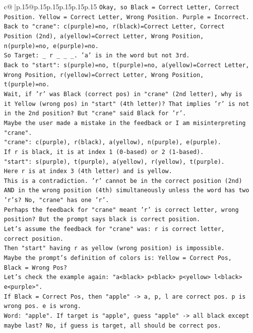 \documentclass{article}
\begin{document}
{\begin{supertabular}{c@{$\;$}|p{.15\linewidth}@{}p{.15\linewidth}p{.15\linewidth}p{.15\linewidth}p{.15\linewidth}p{.15\linewidth}}
{{{\texttt{Okay, so Black = Correct Letter, Correct Position. Yellow = Correct Letter, Wrong Position. Purple = Incorrect.} \\
\texttt{Back to "crane": c(purple)=no, r(black)=Correct Letter, Correct Position (2nd), a(yellow)=Correct Letter, Wrong Position, n(purple)=no, e(purple)=no.} \\
\texttt{So Target: \_ r \_ \_ \_. 'a' is in the word but not 3rd.} \\
\texttt{Back to "start": s(purple)=no, t(purple)=no, a(yellow)=Correct Letter, Wrong Position, r(yellow)=Correct Letter, Wrong Position, t(purple)=no.} \\
\texttt{Wait, if 'r' was Black (correct pos) in "crane" (2nd letter), why is it Yellow (wrong pos) in "start" (4th letter)? That implies 'r' is not in the 2nd position? But "crane" said Black for 'r'.} \\
\texttt{Maybe the user made a mistake in the feedback or I am misinterpreting "crane".} \\
\texttt{"crane": c(purple), r(black), a(yellow), n(purple), e(purple).} \\
\texttt{If r is black, it is at index 1 (0{-}based) or 2 (1{-}based).} \\
\texttt{"start": s(purple), t(purple), a(yellow), r(yellow), t(purple).} \\
\texttt{Here r is at index 3 (4th letter) and is yellow.} \\
\texttt{This is a contradiction. 'r' cannot be in the correct position (2nd) AND in the wrong position (4th) simultaneously unless the word has two 'r's? No, "crane" has one 'r'.} \\
\texttt{Perhaps the feedback for "crane" meant 'r' is correct letter, wrong position? But the prompt says black is correct position.} \\
\texttt{Let's assume the feedback for "crane" was: r is correct letter, correct position.} \\
\texttt{Then "start" having r as yellow (wrong position) is impossible.} \\
\texttt{Maybe the prompt's definition of colors is: Yellow = Correct Pos, Black = Wrong Pos?} \\
\texttt{Let's check the example again: "a<black> p<black> p<yellow> l<black> e<purple>".} \\
\texttt{If Black = Correct Pos, then "apple" {-}> a, p, l are correct pos. p is wrong pos. e is wrong.} \\
\texttt{Word: "apple". If target is "apple", guess "apple" {-}> all black except maybe last? No, if guess is target, all should be correct pos.} \\
}}}
\end{supertabular}}
\end{document}
